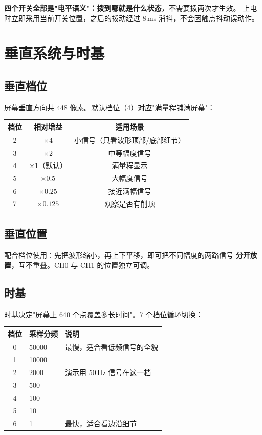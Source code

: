 \documentclass[UTF8,a4paper,11pt]{ctexart}
\begin{document}
\begin{tipbox}
\textbf{四个开关全部是"电平语义"：拨到哪就是什么状态}，不需要拨两次才生效。
上电时立即采用当前开关位置，之后的拨动经过 8\,ms 消抖，不会因触点抖动误动作。
\end{tipbox}

\section{垂直系统与时基}

\subsection{垂直档位}

屏幕垂直方向共 448 像素。默认档位（4）对应"满量程铺满屏幕"：

\begin{center}
\small
\begin{tabular}{ccc}
\toprule
档位 & 相对增益 & 适用场景\\
\midrule
2 & $\times4$ & 小信号（只看波形顶部/底部细节）\\
3 & $\times2$ & 中等幅度信号\\
4 & $\times1$（默认） & 满量程显示\\
5 & $\times0.5$ & 大幅度信号\\
6 & $\times0.25$ & 接近满幅信号\\
7 & $\times0.125$ & 观察是否有削顶\\
\bottomrule
\end{tabular}
\end{center}

\subsection{垂直位置}

配合档位使用：先把波形缩小，再上下平移，即可把不同幅度的两路信号
\textbf{分开放置}，互不重叠。CH0 与 CH1 的位置独立可调。

\subsection{时基}

时基决定"屏幕上 640 个点覆盖多长时间"。7 个档位循环切换：

\begin{center}
\small
\begin{tabular}{cll}
\toprule
档位 & 采样分频 & 说明\\
\midrule
0 & 50000 & 最慢，适合看低频信号的全貌\\
1 & 10000 & \\
2 & 2000 & 演示用 50\,Hz 信号在这一档\\
3 & 500 & \\
4 & 100 & \\
5 & 10 & \\
6 & 1 & 最快，适合看边沿细节\\
\bottomrule
\end{tabular}
\end{center}
\end{document}
